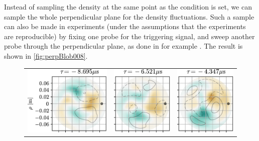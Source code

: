 Instead of sampling the density at the same point as the condition is set, we can sample the whole perpendicular plane for the density fluctuations.
Such a sample can also be made in experiments (under the assumptions that the experiments are reproducible) by fixing one probe for the triggering signal, and sweep another probe through the perpendicular plane, as done in for example \cite{Nielsen1996}.
The result is shown in \cref{fig:perpBlob008}.
%
\begin{figure}[h!]
\begin{tabular}{ccc}
  \includegraphics{fig/results/blobs/matrix-perp-blobs-B0_0.08-fluct/0} &
  \includegraphics{fig/results/blobs/matrix-perp-blobs-B0_0.08-fluct/1} &
  \includegraphics{fig/results/blobs/matrix-perp-blobs-B0_0.08-fluct/2} \\

\end{tabular}
\end{figure}
